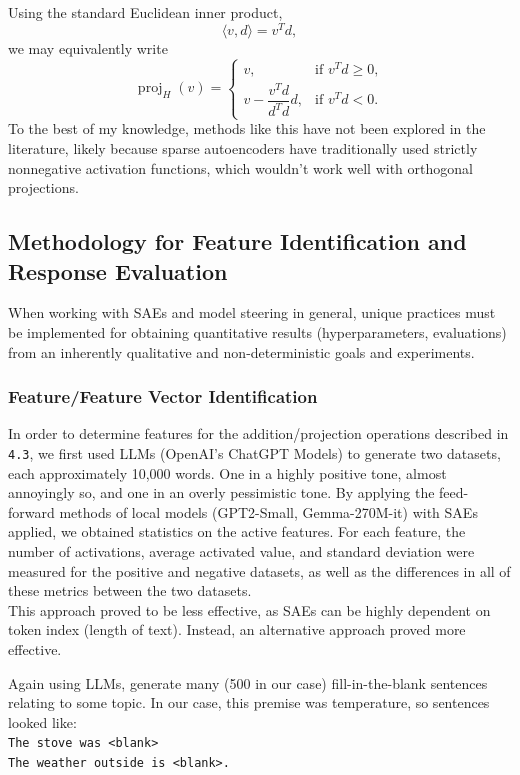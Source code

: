 \documentclass{article}
\begin{document}
Using the standard Euclidean inner product,
\[
\langle v,d\rangle = v^{T}d,
\]
we may equivalently write
\[
\operatorname{proj}_{H}(v)
=
\begin{cases}
v,
& \text{if } v^{T}d \ge 0, \\[8pt]
v - \dfrac{v^{T}d}{d^{T}d}d,
& \text{if } v^{T}d < 0.
\end{cases}
\]
To the best of my knowledge, methods like this have not been explored in the literature, likely because sparse autoencoders have traditionally used strictly nonnegative activation functions, which wouldn't work well with orthogonal projections.

\subsection{}

\subsection{Methodology for Feature Identification and Response Evaluation}
When working with SAEs and model steering in general, unique practices must be implemented for obtaining quantitative results (hyperparameters, evaluations) from an inherently qualitative and non-deterministic goals and experiments.\\

\subsubsection{Feature/Feature Vector Identification}
In order to determine features for the addition/projection operations described in \texttt{4.3}, we first used LLMs (OpenAI's ChatGPT Models) to generate two datasets, each approximately 10,000 words. One in a highly positive tone, almost annoyingly so, and one in an overly pessimistic tone. By applying the feed-forward methods of local models (GPT2-Small, Gemma-270M-it) with SAEs applied, we obtained statistics on the active features. For each feature, the number of activations, average activated value, and standard deviation were measured for the positive and negative datasets, as well as the differences in all of these metrics between the two datasets.\\

This approach proved to be less effective, as SAEs can be highly dependent on token index (length of text). Instead, an alternative approach proved more effective.

Again using LLMs, generate many (500 in our case) fill-in-the-blank sentences relating to some topic. In our case, this premise was temperature, so sentences looked like:\\
\texttt{The stove was <blank>\\The weather outside is <blank>.}\\
\end{document}
